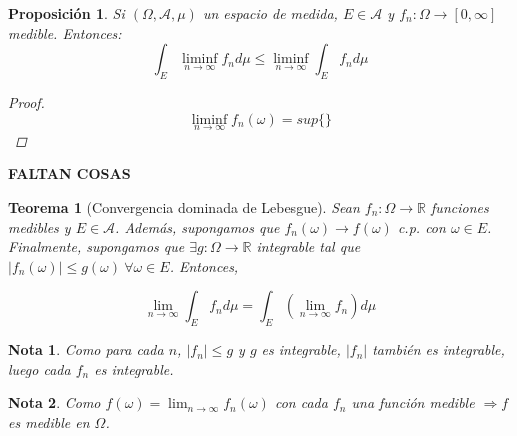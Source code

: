 \documentclass[11pt, a4paper]{article}
\newcommand{\R}{\mathbb{R}}
\theoremstyle{theorem-style}
\newtheorem{nth}{Teorema}[section]
\newtheorem{nprop}{Proposición}[section]
\theoremstyle{definition-style}
\theoremstyle{remark-style}
\newtheorem*{nota}{Nota}
\theoremstyle{example-style}
\begin{document}
\begin{nprop}
	Si $(\Omega,\mathcal{A},\mu)$ un espacio de medida, $E\in \mathcal{A}$ y $f_n:\Omega \to [0,\infty]$ medible. Entonces:
	\[
	\int_E \liminf_{n \to \infty} f_n d\mu \leq \liminf_{n\to \infty} \int_E f_n d\mu
	\]
	\begin{proof}\hfill \\
	\[
\liminf_{n\to \infty} f_n(\omega) = sup\{\}	
	\]
	
\end{proof}
\end{nprop}

\textbf{FALTAN COSAS}



\begin{nth}[Convergencia dominada de Lebesgue]
	Sean $f_n : \Omega \rightarrow \R$ funciones medibles y $E \in \mathcal{A}$. Además, supongamos que ${f_n(\omega)} \rightarrow f(\omega)$ c.p. con $\omega \in E$. Finalmente, supongamos que $\exists g: \Omega \rightarrow \R$ integrable tal que $|f_n(\omega)| \leq g(\omega) \ \forall \omega \in E$. Entonces,
	
	$$ \lim_{n \to \infty} \int_E f_n d \mu = \int_E  \left( \lim_{n \to \infty} f_n \right) d \mu$$ 
\end{nth}

\begin{nota}
	Como para cada $n$, $|f_n| \leq g$ y $g$ es integrable, $|f_n|$ también es integrable, luego cada $f_n$ es integrable.
\end{nota}

\begin{nota}
	Como $f(\omega) = \lim_{n \to \infty} f_n(\omega)$ con cada $f_n$ una función medible $\Rightarrow f$ es medible en $\Omega$.
\end{nota}
\end{document}
